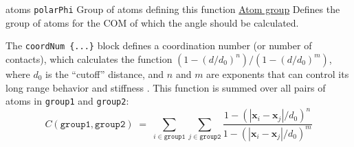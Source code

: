 \begin{cvcoptions}
\item %
  \key
    {atoms}{%
    \texttt{polarPhi}}{%
    Group of atoms defining this function}{%
    \hyperref[sec:colvar_atom_groups]{Atom group}}{%
    Defines the group of atoms for the COM of which the angle should be calculated.
    }
\end{cvcoptions}





The \texttt{coordNum \{...\}} block defines
a coordination number (or number of contacts), which calculates the
function $(1-(d/d_0)^{n})/(1-(d/d_0)^{m})$, where $d_0$ is the
``cutoff'' distance, and $n$ and $m$ are exponents that can control
its long range behavior and stiffness \cite{Iannuzzi2003}.  This
function is summed over all pairs of atoms in \texttt{group1} and
\texttt{group2}:
\begin{equation}
  \label{eq:cvc_coordNum}
  C (\mathtt{group1}, \mathtt{group2}) \; = \;
  \sum_{i\in\mathtt{group1}}\sum_{j\in\mathtt{group2}} {
    \frac{1 - (|\mathbf{x}_{i}-\mathbf{x}_{j}|/d_{0})^{n}}{
      1 - (|\mathbf{x}_{i}-\mathbf{x}_{j}|/d_{0})^{m} }
  }
\end{equation}

